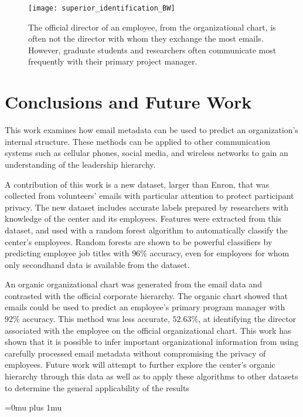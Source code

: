 \documentclass[10pt,twocolumn,conference]{IEEEtran}
\begin{document}
\begin{figure}[t]
	\centering
	\texttt{[image: superior\_identification\_BW]}
	\caption{The official director of an employee, from the organizational chart, is often not the director with whom they exchange the most emails.  However, graduate students and researchers often communicate most frequently with their primary project manager.}
	\label{fig:project_analysis}
\end{figure}

\section{Conclusions and Future Work} \label{Conclusions}
This work examines how email metadata can be used to predict an organization's internal structure.
These methods can be applied to other communication systems such as cellular phones, social media, and wireless networks to gain an understanding of the leadership hierarchy.

A contribution of this work is a new dataset, larger than Enron, that was collected from volunteers' emails with particular attention to protect participant privacy.
The new dataset includes accurate labels prepared by researchers with knowledge of the center and its employees.
Features were extracted from this dataset, and used with a random forest algorithm to automatically classify the center's employees.
Random forests are shown to be powerful classifiers by predicting employee job titles with $96\%$ accuracy, even for employees for whom only secondhand data is available from the dataset.

An organic organizational chart was generated from the email data and contrasted with the official corporate hierarchy.
The organic chart showed that emails could be used to predict an employee's primary program manager with $92\%$ accuracy.
This method was less accurate, $52.63\%$, at identifying the director associated with the employee on the official organizational chart.
This work has shown that it is possible to infer important organizational information from using carefully processed email metadata without compromising the privacy of employees.
Future work will attempt to further explore the center's organic hierarchy through this data as well as to apply these algorithms to other datasets to determine the general applicability of the results


\balance


\Urlmuskip=0mu plus 1mu\relax


\end{document}

